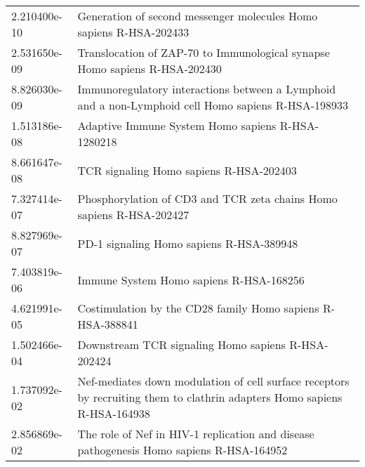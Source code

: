 \begin{longtable}{p{2.4cm}p{14.5cm}}
\bottomrule
\endlastfoot
             2.210400e-10 &                                                        Generation of second messenger molecules Homo sapiens R-HSA-202433 \\
             2.531650e-09 &                                                Translocation of ZAP-70 to Immunological synapse Homo sapiens R-HSA-202430 \\
             8.826030e-09 &                        Immunoregulatory interactions between a Lymphoid and a non-Lymphoid cell Homo sapiens R-HSA-198933 \\
             1.513186e-08 &                                                                         Adaptive Immune System Homo sapiens R-HSA-1280218 \\
             8.661647e-08 &                                                                                   TCR signaling Homo sapiens R-HSA-202403 \\
             7.327414e-07 &                                                      Phosphorylation of CD3 and TCR zeta chains Homo sapiens R-HSA-202427 \\
             8.827969e-07 &                                                                                  PD-1 signaling Homo sapiens R-HSA-389948 \\
             7.403819e-06 &                                                                                   Immune System Homo sapiens R-HSA-168256 \\
             4.621991e-05 &                                                                Costimulation by the CD28 family Homo sapiens R-HSA-388841 \\
             1.502466e-04 &                                                                        Downstream TCR signaling Homo sapiens R-HSA-202424 \\
             1.737092e-02 &  Nef-mediates down modulation of cell surface receptors by recruiting them to clathrin adapters Homo sapiens R-HSA-164938 \\
             2.856869e-02 &                                   The role of Nef in HIV-1 replication and disease pathogenesis Homo sapiens R-HSA-164952 \\
\end{longtable}


